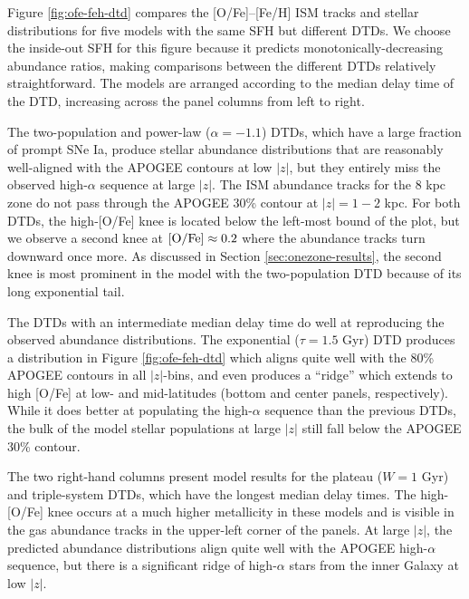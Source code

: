 \documentclass[twocolumn,twocolappendix,linenumbers]{aastex631}
\begin{document}
Figure \ref{fig:ofe-feh-dtd} compares the [O/Fe]--[Fe/H] ISM tracks and stellar distributions for five models with the same SFH but different DTDs. We choose the inside-out SFH for this figure because it predicts monotonically-decreasing abundance ratios, making comparisons between the different DTDs relatively straightforward. 
The models are arranged according to the median delay time of the DTD, increasing across the panel columns from left to right. 

The two-population and power-law ($\alpha=-1.1$) DTDs, which have a large fraction of prompt SNe Ia, produce stellar abundance distributions that are reasonably well-aligned with the APOGEE contours at low $|z|$, but they entirely miss the observed high-$\alpha$ sequence at large $|z|$. The ISM abundance tracks for the 8 kpc zone do not pass through the APOGEE 30\% contour at $|z|=1-2$ kpc. For both DTDs, the high-[O/Fe] knee is located below the left-most bound of the plot, but we observe a second knee at ${\rm [O/Fe]}\approx0.2$ where the abundance tracks turn downward once more. As discussed in Section \ref{sec:onezone-results}, the second knee is most prominent in the model with the two-population DTD because of its long exponential tail.

The DTDs with an intermediate median delay time do well at reproducing the observed abundance distributions. The exponential ($\tau=1.5$ Gyr) DTD produces a distribution in Figure \ref{fig:ofe-feh-dtd} which aligns quite well with the 80\% APOGEE contours in all $|z|$-bins, and even produces a ``ridge'' which extends to high [O/Fe] at low- and mid-latitudes (bottom and center panels, respectively). While it does better at populating the high-$\alpha$ sequence than the previous DTDs, the bulk of the model stellar populations at large $|z|$ still fall below the APOGEE 30\% contour. 

The two right-hand columns present model results for the plateau ($W=1$ Gyr) and triple-system DTDs, which have the longest median delay times. The high-[O/Fe] knee occurs at a much higher metallicity in these models and is visible in the gas abundance tracks in the upper-left corner of the panels. At large $|z|$, the predicted abundance distributions align quite well with the APOGEE high-$\alpha$ sequence, but there is a significant ridge of high-$\alpha$ stars from the inner Galaxy at low $|z|$.
\end{document}
